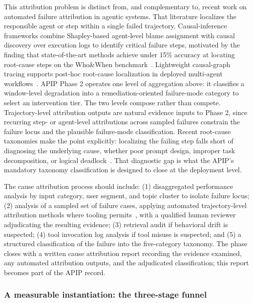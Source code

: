 \documentclass[conference]{IEEEtran}
\begin{document}
This attribution problem is distinct from, and complementary to, recent work on
automated failure attribution in agentic systems. That literature localizes the
responsible agent or step within a single failed trajectory. Causal-inference
frameworks combine Shapley-based agent-level blame assignment with causal
discovery over execution logs to identify critical failure steps, motivated by
the finding that state-of-the-art methods achieve under 15\% accuracy at
locating root-cause steps on the Who\&When
benchmark~\cite{ma2025attribution,zhang2025whichagent}. Lightweight causal-graph
tracing supports post-hoc root-cause localization in deployed multi-agent
workflows~\cite{agenttrace2026}. APIP Phase 2 operates one level of aggregation
above: it classifies a window-level degradation into a remediation-oriented
failure-mode category to select an intervention tier. The two levels compose
rather than compete. Trajectory-level attribution outputs are natural evidence
inputs to Phase 2, since recurring step- or agent-level attributions across
sampled failures constrain the failure locus and the plausible failure-mode
classification. Recent root-cause taxonomies make the point explicitly:
localizing the failing step falls short of diagnosing the underlying cause,
whether poor prompt design, improper task decomposition, or logical
deadlock~\cite{ma2025lifecycle}. That diagnostic gap is what the APIP's
mandatory taxonomy classification is designed to close at the deployment level.

The cause attribution process should include: (1) disaggregated performance
analysis by input category, user segment, and topic cluster to isolate failure
locus; (2) analysis of a sampled set of failure cases, applying automated
trajectory-level attribution methods where tooling
permits~\cite{ma2025attribution,agenttrace2026,zhu2026agentdebugx}, with a
qualified human reviewer adjudicating the resulting evidence; (3) retrieval
audit if behavioral drift is suspected; (4) tool invocation log analysis if tool
misuse is suspected; and (5) a structured classification of the failure into the
five-category taxonomy. The phase closes with a written cause attribution report
recording the evidence examined, any automated attribution outputs, and the
adjudicated classification; this report becomes part of the APIP record.

\subsubsection{A measurable instantiation: the three-stage funnel}
\label{subsubsec:funnel}
\end{document}
